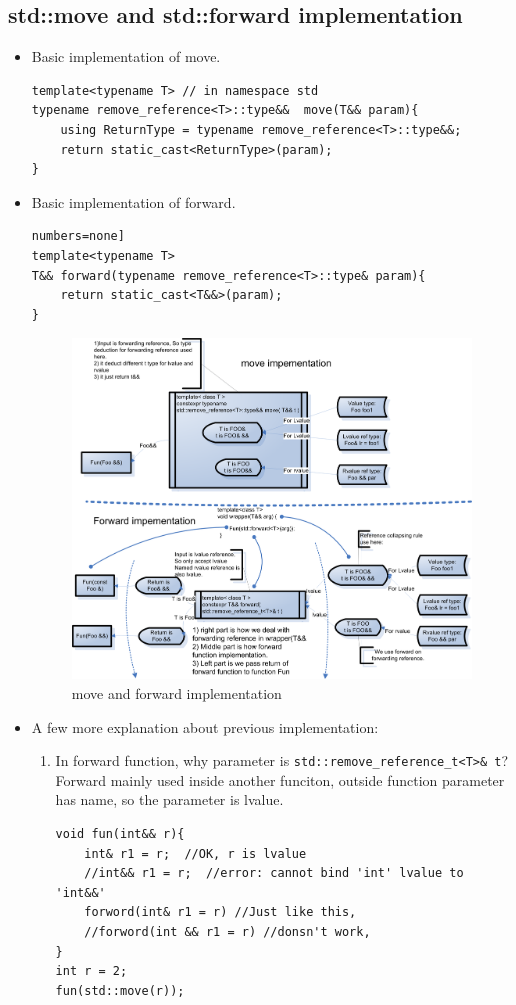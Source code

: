 \documentclass[a4paper,11pt,twoside]{book}
\begin{document}
\subsection{std::move and std::forward implementation}
\begin{itemize}
	\item Basic implementation of move.
\begin{lstlisting}[numbers=none]
template<typename T> // in namespace std
typename remove_reference<T>::type&&  move(T&& param){
	using ReturnType = typename remove_reference<T>::type&&; 
	return static_cast<ReturnType>(param);
}
\end{lstlisting}
	
	\item Basic implementation of forward.
\begin{lstlisting}numbers=none]
template<typename T>
T&& forward(typename remove_reference<T>::type& param){
	return static_cast<T&&>(param);
}
\end{lstlisting}

	\begin{figure}[h]
	\centering
	\includegraphics[width=0.85\linewidth]{pics/rvalue_ref.png}
	\caption{move and forward implementation}
	\label{fig:rvalueref}
\end{figure}

    \item A few more explanation about previous implementation:
    \begin{enumerate}
        \item In forward function, why parameter is \texttt{std::remove\_reference\_t<T>\& t}? Forward mainly used inside another funciton, outside function parameter has name, so the parameter is lvalue.
\begin{lstlisting}
void fun(int&& r){
	int& r1 = r;  //OK, r is lvalue
	//int&& r1 = r;  //error: cannot bind 'int' lvalue to 'int&&'
	forword(int& r1 = r) //Just like this, 
	//forword(int && r1 = r) //donsn't work, 
}
int r = 2;
fun(std::move(r));
\end{lstlisting}


\end{enumerate}
\end{itemize}
\end{document}
